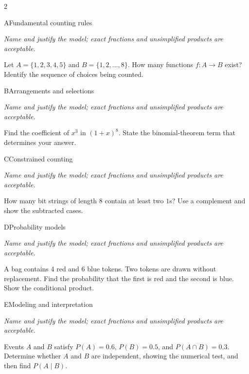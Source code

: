 \documentclass[9pt]{extarticle}
\begin{document}
\CoreWorkArea
\FormBreak
{}
\begin{multicols}{2}
\begin{CoreProblem}{A}{Fundamental counting rules}
{\scriptsize\textit{Name and justify the model; exact fractions and unsimplified products are acceptable.}\par}
Let $A=\{1,2,3,4,5\}$ and $B=\{1,2,\ldots,8\}$. How many functions
    $f:A\to B$ exist? Identify the sequence of choices being counted.
\end{CoreProblem}
\begin{CoreProblem}{B}{Arrangements and selections}
{\scriptsize\textit{Name and justify the model; exact fractions and unsimplified products are acceptable.}\par}
Find the coefficient of $x^3$ in $(1+x)^8$. State the binomial-theorem
    term that determines your answer.
\end{CoreProblem}
\begin{CoreProblem}{C}{Constrained counting}
{\scriptsize\textit{Name and justify the model; exact fractions and unsimplified products are acceptable.}\par}
How many bit strings of length 8 contain at least two $1$s? Use a
    complement and show the subtracted cases.
\end{CoreProblem}
\columnbreak
\begin{CoreProblem}{D}{Probability models}
{\scriptsize\textit{Name and justify the model; exact fractions and unsimplified products are acceptable.}\par}
A bag contains 4 red and 6 blue tokens. Two tokens are drawn without
    replacement. Find the probability that the first is red and the second is
    blue. Show the conditional product.
\end{CoreProblem}
\begin{CoreProblem}{E}{Modeling and interpretation}
{\scriptsize\textit{Name and justify the model; exact fractions and unsimplified products are acceptable.}\par}
Events $A$ and $B$ satisfy $P(A)=0.6$, $P(B)=0.5$, and
    $P(A\cap B)=0.3$. Determine whether $A$ and $B$ are independent, showing
    the numerical test, and then find $P(A\mid B)$.
\end{CoreProblem}
\end{multicols}
\CoreWorkArea
\FormBreak
{}
\end{document}
